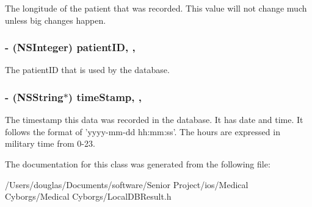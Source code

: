 The longitude of the patient that was recorded. This value will not change much unless big changes happen. \hypertarget{interface_local_d_b_result_a5cdd651e87ce4b0e2ed296fd1a54f271}{
\subsubsection[{patient\-I\-D}]{\setlength{\rightskip}{0pt plus 5cm}-\/ (N\-S\-Integer) patient\-I\-D\hspace{0.3cm}{\ttfamily [read]}, {\ttfamily [write]}, {\ttfamily [atomic]}}}\label{interface_local_d_b_result_a5cdd651e87ce4b0e2ed296fd1a54f271}
The patient\-I\-D that is used by the database. \hypertarget{interface_local_d_b_result_a7538fcbcfd150e5353d3d4e531bef2bc}{
\subsubsection[{time\-Stamp}]{\setlength{\rightskip}{0pt plus 5cm}-\/ (N\-S\-String$\ast$) time\-Stamp\hspace{0.3cm}{\ttfamily [read]}, {\ttfamily [write]}, {\ttfamily [atomic]}}}\label{interface_local_d_b_result_a7538fcbcfd150e5353d3d4e531bef2bc}
The timestamp this data was recorded in the database. It has date and time. It follows the format of 'yyyy-\/mm-\/dd hh\-:mm\-:ss'. The hours are expressed in military time from 0-\/23. 

The documentation for this class was generated from the following file\-:\begin{DoxyCompactItemize}
\item 
/\-Users/douglas/\-Documents/software/\-Senior Project/ios/\-Medical Cyborgs/\-Medical Cyborgs/Local\-D\-B\-Result.\-h\end{DoxyCompactItemize}
